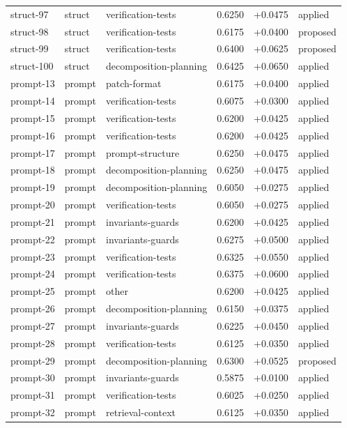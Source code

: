 \begin{center}
\begin{longtable}{llp{5.2cm}rrl}
struct-97 & struct & verification-tests & 0.6250 & +0.0475 & applied \\
struct-98 & struct & verification-tests & 0.6175 & +0.0400 & proposed \\
struct-99 & struct & verification-tests & 0.6400 & +0.0625 & proposed \\
struct-100 & struct & decomposition-planning & 0.6425 & +0.0650 & applied \\
prompt-13 & prompt & patch-format & 0.6175 & +0.0400 & applied \\
prompt-14 & prompt & verification-tests & 0.6075 & +0.0300 & applied \\
prompt-15 & prompt & verification-tests & 0.6200 & +0.0425 & applied \\
prompt-16 & prompt & verification-tests & 0.6200 & +0.0425 & applied \\
prompt-17 & prompt & prompt-structure & 0.6250 & +0.0475 & applied \\
prompt-18 & prompt & decomposition-planning & 0.6250 & +0.0475 & applied \\
prompt-19 & prompt & decomposition-planning & 0.6050 & +0.0275 & applied \\
prompt-20 & prompt & verification-tests & 0.6050 & +0.0275 & applied \\
prompt-21 & prompt & invariants-guards & 0.6200 & +0.0425 & applied \\
prompt-22 & prompt & invariants-guards & 0.6275 & +0.0500 & applied \\
prompt-23 & prompt & verification-tests & 0.6325 & +0.0550 & applied \\
prompt-24 & prompt & verification-tests & 0.6375 & +0.0600 & applied \\
prompt-25 & prompt & other & 0.6200 & +0.0425 & applied \\
prompt-26 & prompt & decomposition-planning & 0.6150 & +0.0375 & applied \\
prompt-27 & prompt & invariants-guards & 0.6225 & +0.0450 & applied \\
prompt-28 & prompt & verification-tests & 0.6125 & +0.0350 & applied \\
prompt-29 & prompt & decomposition-planning & 0.6300 & +0.0525 & proposed \\
prompt-30 & prompt & invariants-guards & 0.5875 & +0.0100 & applied \\
prompt-31 & prompt & verification-tests & 0.6025 & +0.0250 & applied \\
prompt-32 & prompt & retrieval-context & 0.6125 & +0.0350 & applied \\

\end{longtable}
\end{center}
